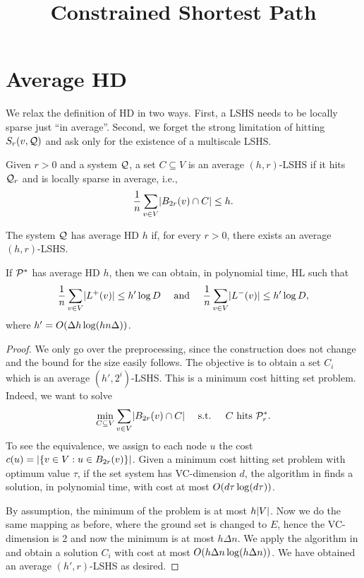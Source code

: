 \documentclass[letterpaper,11pt]{article}
\title{\vspace{-1cm} \bf Constrained Shortest Path \vspace{-1.3cm}}
\author{}
\begin{document}
\maketitle


\section{Average HD}\label{sec:avg_hd}

We relax the definition of HD in two ways.
First, a LSHS needs to be locally sparse just ``in average''.
Second, we forget the strong limitation of hitting $S_r(v,\mathcal{Q})$ and ask only for the existence of a multiscale LSHS.

\begin{definition}
Given $r>0$ and a system $\mathcal{Q}$, a set $C\subseteq V$ is an average $(h,r)$-LSHS if it hits $\mathcal{Q}_r$ and is locally sparse in average, i.e.,
\[
\frac{1}{n}\sum_{v\in V} \lvert B_{2r}(v)\cap C\rvert \leq h.
\]
\end{definition}

\begin{definition}[Average HD]
The system $\mathcal{Q}$ has average HD $h$ if, for every $r>0$, there exists an average $(h,r)$-LSHS.
\end{definition}

\begin{theorem}\label{theo:preproc_avg}
If $\mathcal{P}^*$ has average HD $h$, then we can obtain, in polynomial time, HL such that 
\[
\frac{1}{n}\sum_{v\in V} \lvert L^+(v)\rvert \leq h'\log D \quad \text{ and }\quad
\frac{1}{n}\sum_{v\in V} \lvert L^-(v)\rvert \leq h'\log D,
\]
where $h'=O(\Delta h\log (hn\Delta))$.
\end{theorem}
\begin{proof}
We only go over the preprocessing, since the construction does not change and the bound for the size easily follows. 
The objective is to obtain a set $C_i$ which is an average $(h',2^i)$-LSHS.
This is a minimum cost hitting set problem.
Indeed, we want to solve
\[
\min_{C\subseteq V} \sum_{v\in V}\lvert B_{2r}(v)\cap C\rvert  \quad \text{ s.t. } \quad C \text{ hits } \mathcal{P}^*_r.
\]
To see the equivalence, we assign to each node $u$ the cost $c(u)=\lvert\{v\in V: u\in B_{2r}(v)\}\rvert$.
Given a minimum cost hitting set problem with optimum value $\tau$, if the set system has VC-dimension $d$, the algorithm in \cite{vc_dim_hitting} finds a solution, in polynomial time, with cost at most $O(d\tau\log(d\tau))$.

By assumption, the minimum of the problem is at most $h\lvert V\rvert$.
Now we do the same mapping as before, where the ground set is changed to $E$, hence the VC-dimension is 2 and now the minimum is at most $h\Delta n$.
We apply the algorithm in \cite{vc_dim_hitting} and obtain a solution $C_i$ with cost at most $O(h\Delta n\log(h\Delta n))$.
We have obtained an average $(h',r)$-LSHS as desired.
\end{proof}
\end{document}
